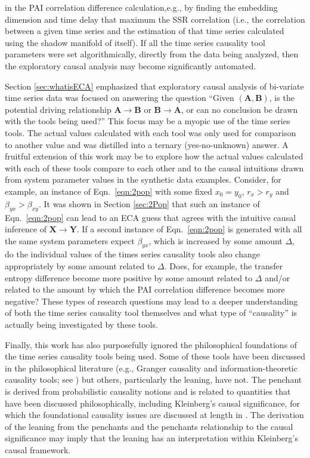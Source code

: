 \documentclass{article}[10pt]
\begin{document}
in the PAI correlation difference calculation,e.g., by finding the embedding dimension and time delay that maximum the SSR correlation (i.e., the correlation between a given time series and the estimation of that time series calculated using the shadow manifold of itself).  If all the time series causality tool parameters were set algorithmically, directly from the data being analyzed, then the exploratory causal analysis may become significantly automated. 

Section \ref{sec:whatisECA} emphasized that exploratory causal analysis of bi-variate time series data was focused on answering the question ``Given $(\mathbf{A},\mathbf{B})$, is the potential driving relationship $\mathbf{A}\rightarrow\mathbf{B}$ or $\mathbf{B}\rightarrow\mathbf{A}$, or can no conclusion be drawn with the tools being used?''  This focus may be a myopic use of the time series tools.  The actual values calculated with each tool was only used for comparison to another value and was distilled into a ternary (yes-no-unknown) answer.  A fruitful extension of this work may be to explore how the actual values calculated with each of these tools compare to each other and to the causal intuitions drawn from system parameter values in the synthetic data examples.  Consider, for example, an instance of Eqn.\ \ref{eqn:2pop} with some fixed $x_0=y_0$, $r_x>r_y$ and $\beta_{yx}>\beta_{xy}$.  It was shown in Section \ref{sec:2Pop} that such an instance of Eqn.\ \ref{eqn:2pop} can lead to an ECA guess that agrees with the intuitive causal inference of $\mathbf{X}\rightarrow\mathbf{Y}$.  If a second instance of Eqn.\ \ref{eqn:2pop} is generated with all the same system parameters expect $\beta_{yx}$, which is increased by some amount $\Delta$, do the individual values of the times series causality tools also change appropriately by some amount related to $\Delta$.  Does, for example, the transfer entropy difference become more positive by some amount related to $\Delta$ and/or related to the amount by which the PAI correlation difference becomes more negative?  These types of research questions may lead to a deeper understanding of both the time series causality tool themselves and what type of ``causality'' is actually being investigated by these tools.

Finally, this work has also purposefully ignored the philosophical foundations of the time series causality tools being used.  Some of these tools have been discussed in the philosophical literature (e.g., Granger causality and information-theoretic causality tools; see \cite{Illari2014}) but others, particularly the leaning, have not.  The penchant is derived from probabilistic causality notions and is related to quantities that have been discussed philosophically, including Kleinberg's causal significance, for which the foundational causality issues are discussed at length in \cite{Kleinberg2012}.  The derivation of the leaning from the penchants and the penchants relationship to the causal significance may imply that the leaning has an interpretation within Kleinberg's causal framework.  



\end{document}

